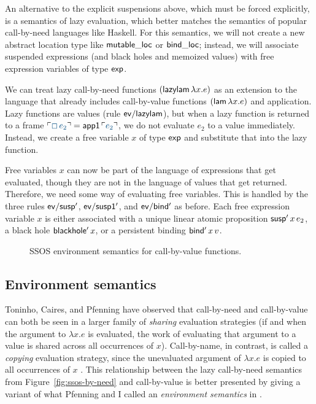 An alternative to the explicit suspensions above, which must be forced
explicitly, is a semantics of lazy evaluation, which better matches
the semantics of popular call-by-need languages like Haskell. For this
semantics, we will not create a new abstract location type like ${\sf
  mutable\_loc}$ or ${\sf bind\_loc}$; instead, we will associate 
suspended expressions (and black holes and memoized values) with
free expression variables of type ${\sf exp}$.

We can treat lazy call-by-need functions $({\sf lazylam}\,\lambda
x.e)$ as an extension to the language that already includes
call-by-value functions $({\sf lam}\,\lambda x.e)$ and
application. Lazy functions are values (rule ${\sf ev/lazylam}$), but
when a lazy function is returned to a frame $\interp{\Box\,e_2} = {\sf
  app1}\,\interp{e_2}$, we do not evaluate $e_2$ to a value
immediately. Instead, we create a free variable $x$ of type ${\sf
  exp}$ and substitute that into the lazy function.

Free variables $x$ can now be part of the language of expressions that
get evaluated, though they are not in the language of values that get
returned. Therefore, we need some way of evaluating free
variables. This is handled by the three rules ${\sf ev/susp'}$, ${\sf
  ev/susp1'}$, and ${\sf ev/bind'}$ as before. Each free expression
variable $x$ is either associated with a unique linear atomic
proposition ${\sf susp'}\,x\,e_2$, a black hole ${\sf blackhole'}\,x$,
or a persistent binding ${\sf bind'}\,x\,v$.

\begin{figure}
\caption{SSOS environment semantics for call-by-value functions.}
\label{fig:ssos-by-env}
\end{figure}


\subsection{Environment semantics}

Toninho, Caires, and Pfenning have observed that call-by-need and
call-by-value can both be seen in a larger family of {\it sharing}
evaluation strategies (if and when the argument to $\lambda x. e$ is
evaluated, the work of evaluating that argument to a value is shared
across all occurrences of $x$). Call-by-name, in contrast, is called a
{\it copying} evaluation strategy, since the unevaluated argument of
$\lambda x. e$ is copied to all occurrences of $x$
\cite{toninho12functions}. This relationship between the lazy
call-by-need semantics from Figure~\ref{fig:ssos-by-need} and
call-by-value is better presented by giving a variant of what Pfenning
and I called an {\it environment semantics} in
\cite{pfenning09substructural}.


